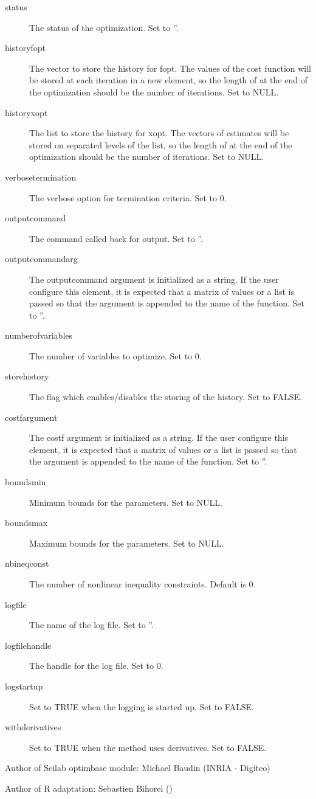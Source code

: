 \begin{Value}
\begin{description}
\item[status] The status of the optimization. Set to ''.
\item[historyfopt] The vector to store the history for fopt. The values of
the cost function will be stored at each iteration in a new element, so
the length of  at the end of the optimization should be
the number of iterations. Set to NULL.
\item[historyxopt] The list to store the history for xopt. The vectors of
estimates will be stored on separated levels of the list, so the length of
 at the end of the optimization should be the number of
iterations. Set to NULL.
\item[verbosetermination] The verbose option for termination criteria.
Set to 0.
\item[outputcommand] The command called back for output. Set to ''.
\item[outputcommandarg] The outputcommand argument is initialized as a
string. If the user configure this element, it is expected that a matrix
of values or a list is passed so that the argument is appended to the name
of the function. Set to ''.
\item[numberofvariables] The number of variables to optimize. Set to
0.
\item[storehistory] The flag which enables/disables the storing of the
history. Set to FALSE.
\item[costfargument] The costf argument is initialized as a string. If
the user configure this element, it is expected that a matrix of values
or a list is passed so that the argument is appended to the name of the
function. Set to ''.
\item[boundsmin] Minimum bounds for the parameters. Set to NULL.
\item[boundsmax] Maximum bounds for the parameters. Set to NULL.
\item[nbineqconst] The number of nonlinear inequality constraints. Default
is 0.
\item[logfile] The name of the log file. Set to ''.
\item[logfilehandle] The handle for the log file. Set to 0.
\item[logstartup] Set to TRUE when the logging is started up. Set to
FALSE.
\item[withderivatives] Set to TRUE when the method uses derivatives.
Set to FALSE.

\end{description}

\end{Value}
%
\begin{Author}\relax
Author of Scilab optimbase module: Michael Baudin (INRIA - Digiteo)

Author of R adaptation: Sebastien Bihorel ()
\end{Author}
